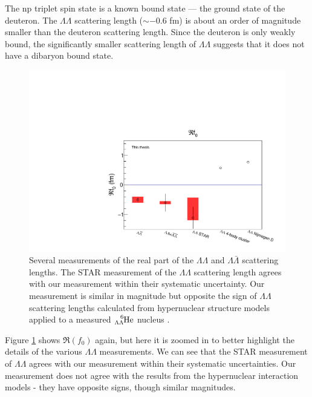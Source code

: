The np triplet spin state is a known bound state --- the ground state of the deuteron.
 The $\Lambda\Lambda$ scattering length ($\sim-0.6$ fm) is about an order of magnitude smaller than the deuteron scattering length.
Since the deuteron is only weakly bound, the significantly smaller scattering length of $\Lambda\Lambda$ suggests that it does not have a dibaryon bound state.

\begin{figure}[hbtp]
\includegraphics[width=36pc]{Figures/FitResults/2016-10-12-Ref0Zoom.pdf}
\caption[Measurements of $\Re(f_0)$ for various particle pairs (zoomed)]{Several measurements of the real part of the $\Lambda\Lambda$ and $\Lambda\bar{\Lambda}$ scattering lengths. The STAR measurement \cite{Adamczyk:2014vca} of the $\Lambda\Lambda$ scattering length agrees with our measurement within their systematic uncertainty. Our measurement is similar in magnitude but opposite the sign of $\Lambda\Lambda$ scattering lengths calculated from hypernuclear structure models \cite{ Hiyama:2002yj, Filikhin:2002wm} applied to a measured $\ce{^{6}_{\Lambda\Lambda}\mathrm{He}}$ nucleus \cite{Takahashi:2001nm}.}
\label{fig:Ref0Zoom}
\end{figure}

Figure \ref{fig:Ref0Zoom} shows $\Re(f_0)$ again, but here it is zoomed in to better highlight the details of the various $\Lambda\Lambda$ measurements.
We can see that the STAR measurement of $\Lambda\Lambda$ agrees with our measurement within their systematic uncertainties.
Our measurement does not agree with the results from the hypernuclear interaction models - they have opposite signs, though similar magnitudes. 



